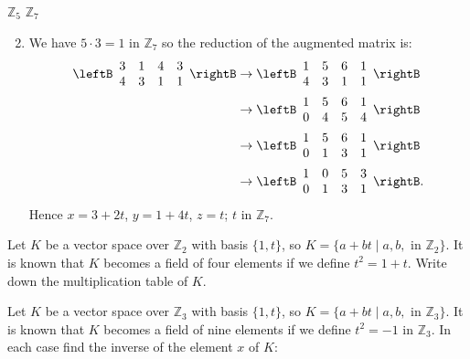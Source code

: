 \begin{multicols}{2}
\begin{ex}
\begin{exenumerate}
\exitem $\mathbb{Z}_5$
\exitem $\mathbb{Z}_7$
\end{exenumerate}
\begin{sol}
\begin{enumerate}[label={\alph*.}]
\setcounter{enumi}{1}
\item We have $5 \cdot 3 = 1$ in $\mathbb{Z}_{7}$ so the reduction of the augmented matrix is:
\begin{align*}
\leftB \begin{array}{rrrr}
3 & 1 & 4 & 3 \\
4 & 3 & 1 & 1 
\end{array}\rightB & \rightarrow  \leftB \begin{array}{rrrr}
1 & 5 & 6 & 1 \\
4 & 3 & 1 & 1 
\end{array}\rightB \\ & \rightarrow  \leftB \begin{array}{rrrr}
1 & 5 & 6 & 1 \\
0 & 4 & 5 & 4 
\end{array}\rightB \\ & \rightarrow  \leftB \begin{array}{rrrr}
1 & 5 & 6 & 1 \\
0 & 1 & 3 & 1 
\end{array}\rightB \\ & \rightarrow  \leftB \begin{array}{rrrr}
1 & 0 & 5 & 3 \\
0 & 1 & 3 & 1 
\end{array}\rightB.
\end{align*}
Hence $x = 3 + 2t$, $y = 1 + 4t$, $z = t$; $t$ in $\mathbb{Z}_{7}$.

\end{enumerate}
\end{sol}
\end{ex}


\begin{ex}
Let $K$ be a vector space over $\mathbb{Z}_2$ with basis $\{1, t\}$, so $K = \{a + bt \mid a, b, \mbox{ in } \mathbb{Z}_2\}$. It is known that $K$ becomes a field of four elements if we define $t^{2} = 1 + t$. Write down the multiplication table of $K$.
\end{ex}

\begin{ex}
Let $K$ be a vector space over $\mathbb{Z}_3$ with basis $\{1, t\}$, so $K = \{a + bt \mid a, b, \mbox{ in } \mathbb{Z}_3\}$. It is known that $K$ becomes a field of nine elements if we define $t^{2} = -1$ in $\mathbb{Z}_3$. In each case find the inverse of the element $x$ of $K$:


\end{ex}
\end{multicols}

